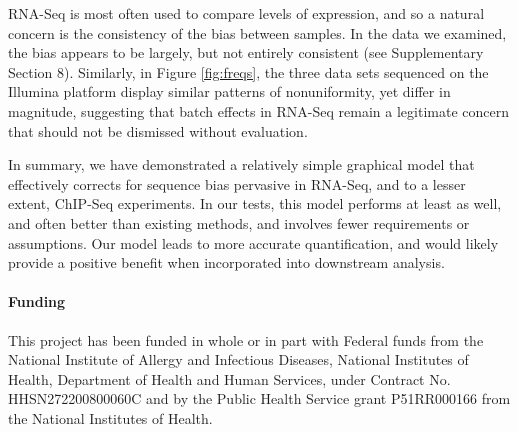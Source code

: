 \documentclass{bioinfo}
\begin{document}
RNA-Seq is most often used to compare levels of expression, and so a natural
concern is the consistency of the bias between samples. In the data we examined,
the bias appears to be largely, but not entirely consistent (see Supplementary
Section 8).  Similarly, in Figure \ref{fig:freqs}, the three data sets sequenced
on the Illumina platform display similar patterns of nonuniformity, yet differ
in magnitude, suggesting that batch effects in RNA-Seq remain a legitimate
concern that should not be dismissed without evaluation.

In summary, we have demonstrated a relatively simple graphical model that
effectively corrects for sequence bias pervasive in RNA-Seq, and to a lesser
extent, ChIP-Seq experiments. In our tests, this model performs at least as
well, and often better than existing methods, and involves fewer requirements or
assumptions. Our model leads to more accurate quantification, and would likely
provide a positive benefit when incorporated into downstream analysis.


\paragraph{Funding\textcolon} This project has been funded in whole or in part
with Federal funds from the National Institute of Allergy and Infectious
Diseases, National Institutes of Health, Department of Health and Human Services,
under Contract No.  HHSN272200800060C and by the Public Health Service grant
P51RR000166 from the National Institutes of Health.




\end{document}

